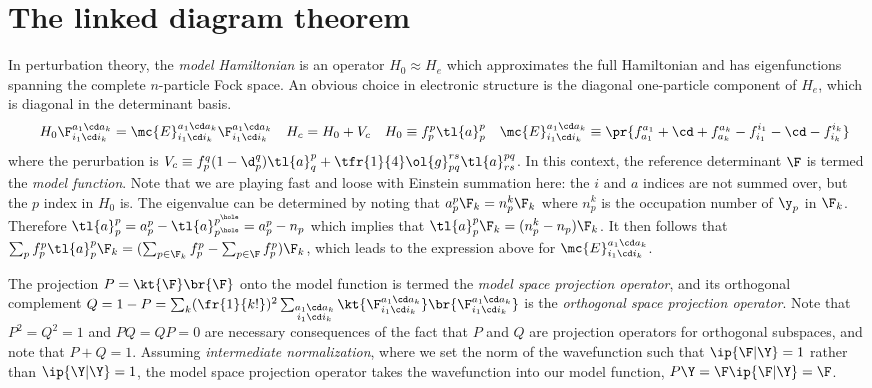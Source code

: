 \documentclass[11pt,fleqn]{article}
\numberwithin{equation}{section}
\begin{document}
\section{The linked diagram theorem}\label{sec:rspt}

\begin{dfn}\label{dfn:model-hamiltonian}
In perturbation theory, the \textit{model Hamiltonian} is an operator $H_0\approx H_e$ which approximates the full Hamiltonian and has eigenfunctions spanning the complete $n$-particle Fock space.
An obvious choice in electronic structure is the diagonal one-particle component of $H_e$, which is diagonal in the determinant basis.
\begin{align*}
&&
  H_0
  \F_{i_1\cd i_k}^{a_1\cd a_k}
=
  \mc{E}_{i_1\cd i_k}^{a_1\cd a_k}
  \F_{i_1\cd i_k}^{a_1\cd a_k}
&&
  H_c
=
  H_0
+
  V_c
&&
  H_0
\equiv
  f_p^p\tl{a}^p_p
&&
  \mc{E}_{i_1\cd i_k}^{a_1\cd a_k}
\equiv
\pr{
  f_{a_1}^{a_1}
+
  \cd
+
  f_{a_k}^{a_k}
-
  f_{i_1}^{i_1}
-
  \cd
-
  f_{i_k}^{i_k}
}
\end{align*}
where the perurbation is
$
  V_c
\equiv
  f_p^q(1-\d_p^q)
  \tl{a}^p_q
+
  \tfr{1}{4}
  \ol{g}_{pq}^{rs}
  \tl{a}^{pq}_{rs}
$.
In this context, the reference determinant $\F$ is termed the \textit{model function}.
Note that we are playing fast and loose with Einstein summation here: the $i$ and $a$ indices are not summed over, but the $p$ index in $H_0$ is.
The eigenvalue can be determined by noting that $a^p_p\F_k=n_p^k\F_k$ where $n_p^k$ is the occupation number of $\y_p$ in $\F_k$.
Therefore $\tl{a}^p_p=a^p_p-\tl{a}^{p^\hole}_{p^\hole}=a^p_p - n_p$ which implies that $\tl{a}^p_p\F_k=(n_p^k-n_p)\F_k$.
It then follows that
$
  \sum_p
  f_p^p
  \tl{a}^p_p
  \F_k
=
(
  \sum_{p\in \F_k}
  f_p^p
-
  \sum_{p\in \F}
  f_p^p
)
\F_k
$,
which leads to the expression above for $\mc{E}_{i_1\cd i_k}^{a_1\cd a_k}$.
\end{dfn}


\begin{dfn}\label{dfn:model-function}
The projection $P=\kt{\F}\br{\F}$ onto the model function is termed the \textit{model space projection operator}, and its orthogonal complement $Q=1-P=\sum_k(\fr{1}{k!})^2\sum_{\substack{a_1\cd a_k\\i_1\cd i_k}}\kt{\F_{i_1\cd i_k}^{a_1\cd a_k}}\br{\F_{i_1\cd i_k}^{a_1\cd a_k}}$ is the \textit{orthogonal space projection operator}.
Note that $P^2=Q^2=1$ and $PQ=QP=0$ are necessary consequences of the fact that $P$ and $Q$ are projection operators for orthogonal subspaces, and note that $P+Q=1$.
Assuming \textit{intermediate normalization}, where we set the norm of the wavefunction such that $\ip{\F|\Y}=1$ rather than $\ip{\Y|\Y}=1$, the model space projection operator takes the wavefunction into our model function, $P\Y=\F\ip{\F|\Y}=\F$.
\end{dfn}
\end{document}
